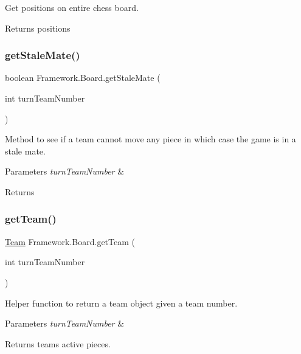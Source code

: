 Get positions on entire chess board. \begin{DoxyReturn}{Returns}
positions 
\end{DoxyReturn}
\hypertarget{class_framework_1_1_board_a78b623ba2854867de4ec93ffdd38e71a}{}\label{class_framework_1_1_board_a78b623ba2854867de4ec93ffdd38e71a} 
\subsubsection{\texorpdfstring{get\+Stale\+Mate()}{getStaleMate()}}
{\footnotesize\ttfamily boolean Framework.\+Board.\+get\+Stale\+Mate (\begin{DoxyParamCaption}\item[{int}]{turn\+Team\+Number }\end{DoxyParamCaption})}

Method to see if a team cannot move any piece in which case the game is in a stale mate. 
\begin{DoxyParams}{Parameters}
{\em turn\+Team\+Number} & \\
\hline
\end{DoxyParams}
\begin{DoxyReturn}{Returns}

\end{DoxyReturn}
\hypertarget{class_framework_1_1_board_ac1a52fc412661b89b7aed7017b26a808}{}\label{class_framework_1_1_board_ac1a52fc412661b89b7aed7017b26a808} 
\subsubsection{\texorpdfstring{get\+Team()}{getTeam()}}
{\footnotesize\ttfamily \hyperlink{class_framework_1_1_team}{Team} Framework.\+Board.\+get\+Team (\begin{DoxyParamCaption}\item[{int}]{turn\+Team\+Number }\end{DoxyParamCaption})}

Helper function to return a team object given a team number. 
\begin{DoxyParams}{Parameters}
{\em turn\+Team\+Number} & \\
\hline
\end{DoxyParams}
\begin{DoxyReturn}{Returns}
team\textquotesingle{}s active pieces. 
\end{DoxyReturn}
\hypertarget{class_framework_1_1_board_ab498be3f988702047c9ac22934fe471a}{}\label{class_framework_1_1_board_ab498be3f988702047c9ac22934fe471a} 
